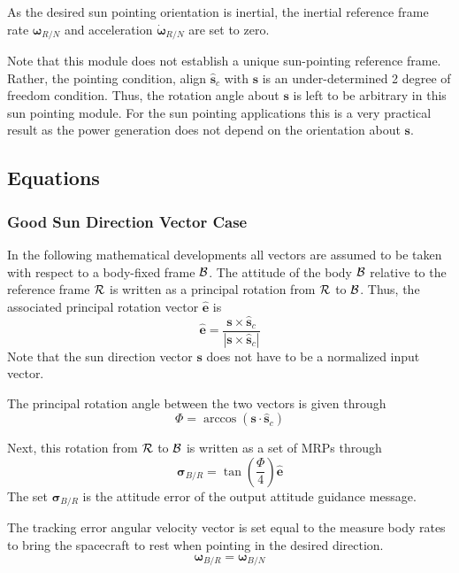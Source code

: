 As the desired sun pointing orientation is inertial, the inertial reference frame rate $\bm\omega_{R/N}$ and acceleration $\dot{\bm\omega}_{R/N}$ are set to zero. 

Note that this module does not establish a unique sun-pointing reference frame.  Rather, the pointing condition, align $\hat{\bm s}_{c}$ with $\bm s$ is an under-determined 2 degree of freedom condition.  Thus, the rotation angle about $\bm s$ is left to be arbitrary in this sun pointing module.  For the sun pointing applications this is a very practical result as the power generation does not depend on the orientation about $\bm s$.  



\subsection{Equations}
\subsubsection{Good Sun Direction Vector Case}
In the following mathematical developments all vectors are assumed to be taken with respect to a body-fixed frame $\cal B$.  The attitude of the body $\cal B$ relative to the reference frame $\cal R$ is written as a principal rotation from $\cal R$ to $\cal B$.  Thus, the associated principal rotation vector $\hat{\bm e}$ is
\begin{equation}
	\label{eq:ssp:1}
	\hat{\bm e} = \frac{\bm s \times \hat{\bm s}_{c}}{|\bm s \times \hat{\bm s}_{c}|}
\end{equation}
Note that the sun direction vector $\bm s$ does not have to be a normalized input vector.  

The principal rotation angle between the two vectors is given through
\begin{equation}
	\label{eq:ssp:2}
	\Phi = \arccos ( \bm s \cdot \hat{\bm s}_{c})
\end{equation}

Next, this rotation from $\cal R$ to $\cal B$ is written as a set of MRPs through
\begin{equation}
	\label{eq:ssp:3}
	\bm\sigma_{B/R} = \tan\left(\frac{\Phi}{4}\right) \hat{\bm e}
\end{equation}
The set $\bm\sigma_{B/R}$ is the attitude error of the output attitude guidance message.  


The tracking error angular velocity vector is set equal to the measure body rates to bring the spacecraft to rest when pointing in the desired direction.
\begin{equation}
	\label{eq:ssp:4}
	\bm\omega_{B/R} = \bm\omega_{B/N}
\end{equation}

